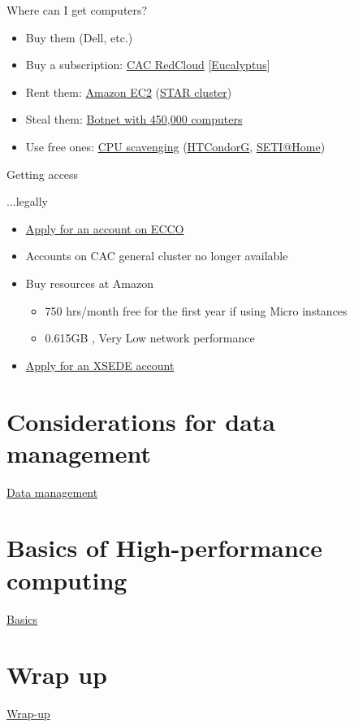 \documentclass[xcolor=table,compress]{beamer}
\begin{document}
\begin{frame}{Where can I get computers?}
\begin{itemize}
\item Buy them (Dell, etc.)
\item Buy a subscription: \href{http://www.cac.cornell.edu/RedCloud/}{CAC RedCloud} [\href{http://www.eucalyptus.com/}{Eucalyptus}]
\item Rent them: \href{http://docs.aws.amazon.com/AWSEC2/latest/UserGuide/using-spot-instances-cluster.html}{Amazon EC2} (\href{http://star.mit.edu/cluster/docs/latest/quickstart.html}{STAR cluster})
\item Steal them: \href{http://en.wikipedia.org/wiki/Srizbi_botnet}{Botnet with 450,000 computers}
\item Use free ones: \href{http://en.wikipedia.org/wiki/CPU_scavenging}{CPU scavenging} \newline(\href{http://en.wikipedia.org/wiki/HTCondor}{HTCondorG}, \href{http://setiathome.berkeley.edu/}{SETI@Home})
\end{itemize}
\end{frame}

\begin{frame}{Getting access}
\begin{block}{...legally}
\begin{itemize}
\item \href{http://www2.vrdc.cornell.edu/news/ecco/step-1-requesting-an-ecco-account/}{Apply for an account on ECCO}
\item Accounts on CAC general cluster no longer available
\item Buy resources at Amazon 
\begin{itemize}
\item 750 hrs/month free for the first year if using Micro instances
\item 0.615GB	, Very Low network performance
\end{itemize}
\item \href{https://www.xsede.org/using-xsede\#step3}{Apply for an XSEDE account}
\end{itemize}
\end{block}
\end{frame}



\section[Data mgmt]{Considerations for data management}
\begin{frame}
\href{day3-2.pdf}{Data management}
\end{frame}
\section[Basics]{Basics of High-performance computing}
\begin{frame}
\href{day3-3.pdf}{Basics}
\end{frame}


\section{Wrap up}

\begin{frame}
\href{day3-4.pdf}{Wrap-up}
\end{frame}
\end{document}
